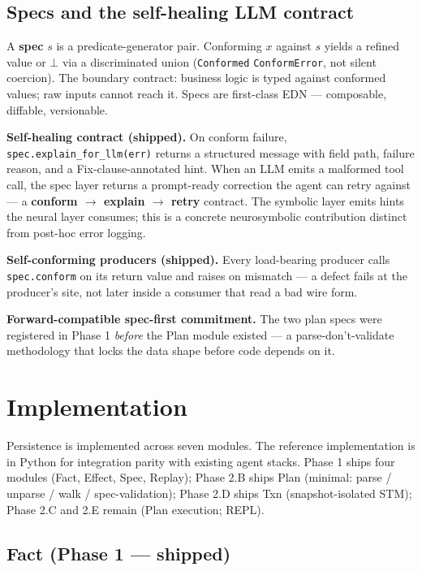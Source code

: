 \documentclass[anon]{nesy2026}   %
\newcommand{\C}[1]{\texttt{#1}}
\begin{document}
\subsection{Specs and the self-healing LLM contract}\label{sec:specs}

A \textbf{spec} $s$ is a predicate-generator pair. Conforming $x$ against $s$ yields a refined value or $\bot$ via a discriminated union (\C{Conformed} \textbar{} \C{ConformError}, not silent coercion). The boundary contract: business logic is typed against conformed values; raw inputs cannot reach it. Specs are first-class EDN --- composable, diffable, versionable.

\textbf{Self-healing contract (shipped).} On conform failure, \C{spec.explain\_for\_llm(err)} returns a structured message with field path, failure reason, and a Fix-clause-annotated hint. When an LLM emits a malformed tool call, the spec layer returns a prompt-ready correction the agent can retry against --- a \textbf{conform $\to$ explain $\to$ retry} contract. The symbolic layer emits hints the neural layer consumes; this is a concrete neurosymbolic contribution distinct from post-hoc error logging.

\textbf{Self-conforming producers (shipped).} Every load-bearing producer calls \C{spec.conform} on its return value and raises on mismatch --- a defect fails at the producer's site, not later inside a consumer that read a bad wire form.

\textbf{Forward-compatible spec-first commitment.} The two plan specs were registered in Phase 1 \emph{before} the Plan module existed --- a parse-don't-validate methodology that locks the data shape before code depends on it.

\section{Implementation}\label{sec:impl}

Persistence is implemented across seven modules. The reference implementation is in Python for integration parity with existing agent stacks. Phase 1 ships four modules (Fact, Effect, Spec, Replay); Phase 2.B ships Plan (minimal: parse / unparse / walk / spec-validation); Phase 2.D ships Txn (snapshot-isolated STM); Phase 2.C and 2.E remain (Plan execution; REPL).

\subsection{Fact (Phase 1 --- shipped)}\label{sec:impl-fact}
\end{document}
